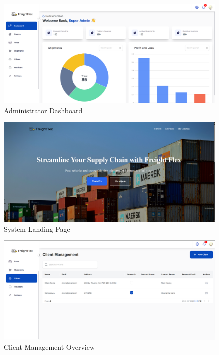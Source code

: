 \begin{figure}[H]
    \centering
    \includegraphics[width=15cm]{graphics/UI/admin-dashboard.png}
    \caption{Administrator Dashboard}
    \label{fig:admin-dashboard}
\end{figure}

\begin{figure}[H]
    \centering
    \includegraphics[width=15cm]{graphics/UI/landing-page.png}
    \caption{System Landing Page}
    \label{fig:landing-page}
\end{figure}

\begin{figure}[H]
    \centering
    \includegraphics[width=15cm]{graphics/UI/client_management.png}
    \caption{Client Management Overview}
    \label{fig:client-management}
\end{figure}

